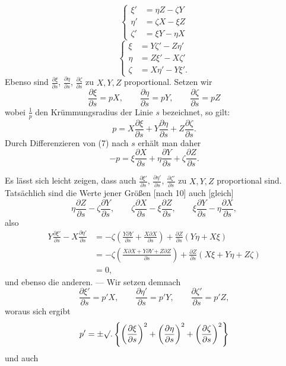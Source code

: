 %
\begin{equation}
\left\{\begin{aligned}\xi'&=\eta Z-\zeta Y\\\eta'&=\zeta X-\xi Z\\\zeta'&=\xi Y-\eta X\end{aligned}\right.\tag*{[10]}
\end{equation}
\begin{equation}
\left\{\begin{aligned}\xi&=Y\zeta'-Z\eta'\\\eta&=Z\xi'-X\zeta'\\\zeta&=X\eta'-Y\xi'.\end{aligned}\right.\tag*{[11]}
\end{equation}
\indent Ebenso sind $\frac{\partial\xi}{\partial s}$, $\frac{\partial\eta}{\partial s}$, $\frac{\partial\zeta}{\partial s}$ zu $X,Y,Z$ proportional. Setzen wir
\[
\frac{\partial\xi}{\partial s}=pX,\qquad\frac{\partial\eta}{\partial s}=pY,\qquad\frac{\partial\zeta}{\partial s}=pZ
\]
wobei $\frac1p$ den Krümmungsradius der Linie $s$ bezeichnet, so gilt:
\[
p=X\frac{\partial\xi}{\partial s}+Y\frac{\partial\eta}{\partial s}+Z\frac{\partial\zeta}{\partial s}.
\]
Durch Differenzieren von (7) nach $s$ erhält man daher
\[
-p=\xi\frac{\partial X}{\partial s}+\eta\frac{\partial Y}{\partial s}+\zeta\frac{\partial Z}{\partial s}.
\]

Es lässt sich leicht zeigen, dass auch $\frac{\partial\xi'}{\partial s}$, $\frac{\partial\eta'}{\partial s}$, $\frac{\partial\zeta'}{\partial s}$ zu $X,Y,Z$ proportional sind. Tatsächlich sind die Werte jener Größen [nach 10] auch [gleich]
\[
\eta\frac{\partial Z}{\partial s}-\zeta\frac{\partial Y}{\partial s},\qquad\zeta\frac{\partial X}{\partial s}-\xi\frac{\partial Z}{\partial s},\qquad\xi\frac{\partial Y}{\partial s}-\eta\frac{\partial X}{\partial s},
\]
also
\[
\begin{aligned}
Y\frac{\partial\xi'}{\partial s}-X\frac{\partial\eta'}{\partial s}&=-\zeta\left(\frac{Y\partial Y}{\partial s}+\frac{X\partial X}{\partial s}\right)+\frac{\partial Z}{\partial s}(Y\eta+X\xi)\\
&=-\zeta\left(\frac{X\partial X+Y\partial Y+Z\partial Z}{\partial s}\right)+\frac{\partial Z}{\partial s}(X\xi+Y\eta+Z\zeta)\\
&=0,
\end{aligned}
\]
und ebenso die anderen. — Wir setzen demnach
\[
\frac{\partial\xi'}{\partial s}=p'X,\qquad\frac{\partial\eta'}{\partial s}=p'Y,\qquad\frac{\partial\zeta'}{\partial s}=p'Z,
\]
woraus sich ergibt
\[
p'=\pm\mathord{\surd}.\left\{\left(\frac{\partial\xi}{\partial s}\right)^{2}+\left(\frac{\partial\eta}{\partial s}\right)^{2}+\left(\frac{\partial\zeta}{\partial s}\right)^{2}\right\}
\]
und auch
